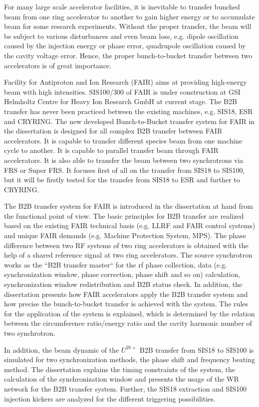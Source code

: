 For many large scale accelerator facilities, it is inevitable to transfer bunched beam from one ring accelerator to another to gain higher energy or to accumulate beam for some research experiments. Without the proper transfer, the beam will be subject to various disturbances and even beam loss, e.g. dipole oscillation caused by the injection energy or phase error, quadrupole oscillation caused by the cavity voltage error. Hence, the proper bunch-to-bucket transfer between two accelerators is of great importance. 

Facility for Antiproton and Ion Research (FAIR) aims at providing high-energy beam with high intensities. SIS100/300 of FAIR is under construction at GSI Helmholtz Centre for Heavy Ion Research GmbH at current stage. The B2B transfer has never been practiced between the existing machines, e.g. SIS18, ESR and CRYRING. The new developed Bunch-to-Bucket transfer system for FAIR in the dissertation is designed for all complex B2B transfer between FAIR accelerators. It is capable to transfer different species beam from one machine cycle to another. It is capable to parallel transfer beam through FAIR accelerators. It is also able to transfer the beam between two synchrotrons via FRS or Super FRS. It focuses first of all on the transfer from SIS18 to SIS100, but it will be firstly tested for the transfer from SIS18 to ESR and further to CRYRING.

The B2B transfer system for FAIR is introduced in the dissertation at hand from the functional point of view. The basic principles for B2B transfer are realized based on the existing FAIR technical basis (e.g. LLRF and FAIR control systems) and unique FAIR demands (e.g. Machine Protection System, MPS). The phase difference between two RF systems of two ring accelerators is obtained with the help of a shared reference signal at two ring accelerators. The source synchrotron works as the ``B2B transfer master`` for the rf phase collection, data (e.g. synchronization window, phase correction, phase shift and so on) calculation, synchronization window redistribution and B2B status check. In addition, the dissertation presents how FAIR accelerators apply the B2B transfer system and how precise the bunch-to-bucket transfer is achieved with the system. The rules for the application of the system is explained, which is determined by the relation between the circumference ratio/energy ratio and the cavity harmonic number of two synchrotron.

In addition, the beam dynamic of the $U^{28+}$ B2B transfer from SIS18 to SIS100 is simulated for two synchronization methods, the phase shift and frequency beating method. The dissertation explains the timing constraints of the system, the calculation of the synchronization window and presents the usage of the WR network for the B2B transfer system. Further, the SIS18 extraction and SIS100 injection kickers are analyzed for the different triggering possibilities. 

